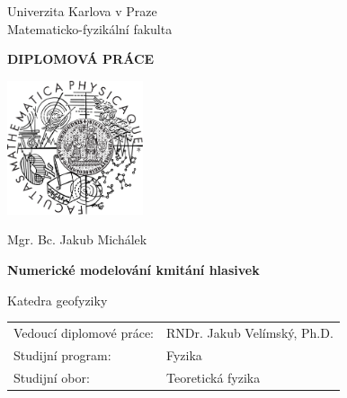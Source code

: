 \begin{center}
Univerzita Karlova v Praze\\
Matematicko-fyzikální fakulta{\large{}\vspace{5mm}
}
\par\end{center}{\large \par}

\begin{center}
\textbf{\Large{}DIPLOMOVÁ PRÁCE\vspace{10mm}
}
\par\end{center}{\Large \par}

\begin{center}
\includegraphics[width=0.3\textwidth]{front/logo}\vspace{15mm}

\par\end{center}

\begin{center}
Mgr. Bc. Jakub Michálek{\Large{} \vspace{5mm}
}
\par\end{center}{\Large \par}

\begin{center}
\textbf{\Large{}Numerické modelování kmitání hlasivek\vspace{5mm}
}
\par\end{center}{\Large \par}

\begin{center}
Katedra geofyziky\textbf{\large{}}\\
\textbf{\large{}\vspace{10mm}
}
\par\end{center}{\large \par}

\noindent \begin{center}
{\large{}}%
\begin{tabular}{>{\raggedleft}p{}>{\raggedright}p{}}
Vedoucí diplomové práce: & RNDr. Jakub Velímský, Ph.D.\tabularnewline
Studijní program: & Fyzika\tabularnewline
Studijní obor: & Teoretická fyzika\tabularnewline
\end{tabular}{\large{} }
\par\end{center}{\large \par}


